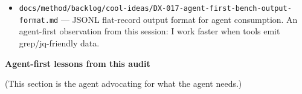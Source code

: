 \begin{itemize}
  \texttt{d\allowbreak{}o\allowbreak{}c\allowbreak{}s\allowbreak{}/\allowbreak{}m\allowbreak{}e\allowbreak{}t\allowbreak{}h\allowbreak{}o\allowbreak{}d\allowbreak{}/\allowbreak{}b\allowbreak{}a\allowbreak{}c\allowbreak{}k\allowbreak{}l\allowbreak{}o\allowbreak{}g\allowbreak{}/\allowbreak{}c\allowbreak{}o\allowbreak{}o\allowbreak{}l\allowbreak{}-\allowbreak{}i\allowbreak{}d\allowbreak{}e\allowbreak{}a\allowbreak{}s\allowbreak{}/\allowbreak{}D\allowbreak{}X\allowbreak{}-\allowbreak{}0\allowbreak{}1\allowbreak{}6\allowbreak{}-\allowbreak{}s\allowbreak{}c\allowbreak{}e\allowbreak{}n\allowbreak{}a\allowbreak{}r\allowbreak{}i\allowbreak{}o\allowbreak{}-\allowbreak{}p\allowbreak{}r\allowbreak{}o\allowbreak{}v\allowbreak{}e\allowbreak{}n\allowbreak{}a\allowbreak{}n\allowbreak{}c\allowbreak{}e\allowbreak{}-\allowbreak{}t\allowbreak{}a\allowbreak{}g\allowbreak{}s\allowbreak{}.\allowbreak{}m\allowbreak{}d} --- tag scenarios for intelligent filtering. Enables targeted CI gates and coverage analysis.
\item
  \texttt{d\allowbreak{}o\allowbreak{}c\allowbreak{}s\allowbreak{}/\allowbreak{}m\allowbreak{}e\allowbreak{}t\allowbreak{}h\allowbreak{}o\allowbreak{}d\allowbreak{}/\allowbreak{}b\allowbreak{}a\allowbreak{}c\allowbreak{}k\allowbreak{}l\allowbreak{}o\allowbreak{}g\allowbreak{}/\allowbreak{}c\allowbreak{}o\allowbreak{}o\allowbreak{}l\allowbreak{}-\allowbreak{}i\allowbreak{}d\allowbreak{}e\allowbreak{}a\allowbreak{}s\allowbreak{}/\allowbreak{}D\allowbreak{}X\allowbreak{}-\allowbreak{}0\allowbreak{}1\allowbreak{}7\allowbreak{}-\allowbreak{}a\allowbreak{}g\allowbreak{}e\allowbreak{}n\allowbreak{}t\allowbreak{}-\allowbreak{}f\allowbreak{}i\allowbreak{}r\allowbreak{}s\allowbreak{}t\allowbreak{}-\allowbreak{}b\allowbreak{}e\allowbreak{}n\allowbreak{}c\allowbreak{}h\allowbreak{}-\allowbreak{}o\allowbreak{}u\allowbreak{}t\allowbreak{}p\allowbreak{}u\allowbreak{}t\allowbreak{}-\allowbreak{}f\allowbreak{}o\allowbreak{}r\allowbreak{}m\allowbreak{}a\allowbreak{}t\allowbreak{}.\allowbreak{}m\allowbreak{}d} --- JSONL flat-record output format for agent consumption. An agent-first observation from this session: I work faster when tools emit grep/jq-friendly data.
\end{itemize}

\textbf{Agent-first lessons from this audit}

(This section is the agent advocating for what the agent needs.)

